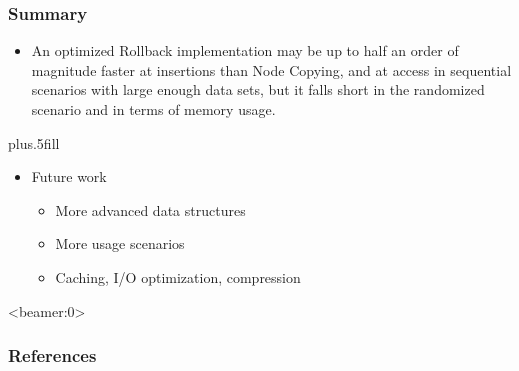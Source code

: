 \documentclass{beamer}
\begin{document}
\begin{frame}
\frametitle<presentation>{Summary}

\begin{itemize}

  \item An optimized Rollback implementation may be up to half an order of
  magnitude faster at insertions than Node Copying, and at access in sequential
  scenarios with large enough data sets, but it falls short in the randomized
  scenario and in terms of memory usage.

\end{itemize}

\vskip0pt plus.5fill
\begin{itemize}
  \item Future work
  \begin{itemize}
    \item More advanced data structures
    \item More usage scenarios
    \item Caching, I/O optimization, compression
  \end{itemize}
\end{itemize}
\end{frame}

\begin{frame}<beamer:0>
\frametitle{References}


\end{frame}
\end{document}
